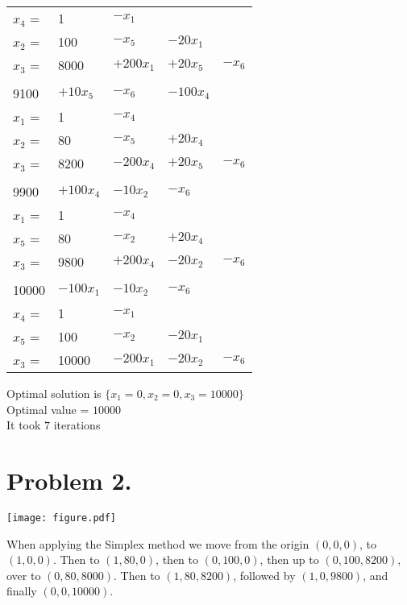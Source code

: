 \documentclass[12pt]{report}
\begin{document}
\begin{tabular}{ l l l l l }
  $x_4$ = & 1 &  $-x_1$ \\ 
  $x_2$ = & 100 & $- x_5$ & $-20x_1$ \\ 
  $x_3$ = & 8000  & $+200x_1$ & $+20x_5$ & $-x_6$  \\ 

  \\
  9100 & $+10x_5$ & $-x_6$ & $-100x_4$  \\  \hline

  $x_1$ = & 1 &  $-x_4$ \\ 
  $x_2$ = & 80 & $- x_5$ & $+20x_4$ \\ 
  $x_3$ = & 8200  & $-200x_4$ & $+20x_5$ & $-x_6$  \\ 

  \\
  9900 & $+100x_4$ & $-10x_2$ & $-x_6$  \\  \hline

  $x_1$ = & 1 &  $-x_4$ \\ 
  $x_5$ = & 80 & $- x_2$ & $+20x_4$ \\ 
  $x_3$ = & 9800  & $+200x_4$ & $-20x_2$ & $-x_6$  \\ 

  \\
  10000 & $-100x_1$ & $-10x_2$ & $-x_6$   \\  \hline

  $x_4$ = & 1 &  $-x_1$ \\ 
  $x_5$ = & 100 & $- x_2$ & $-20x_1$ \\ 
  $x_3$ = & 10000  & $-200x_1$ & $-20x_2$ & $-x_6$  \\ 

\end{tabular}


Optimal solution is $\{ x_1 = 0, x_2 = 0, x_3 = 10000 \}$\\
Optimal value = $10000$ \\
It took $7$ iterations


\section*{Problem 2.}

\texttt{[image: figure.pdf]}

When applying the Simplex method we move from the origin $(0,0,0)$, to $(1,0,0)$.
Then to $(1,80,0)$, then to $(0,100,0)$, then up to $(0,100,8200)$, over to $(0,80,8000)$.
Then to $(1,80,8200)$, followed by $(1,0,9800)$, and finally $(0,0,10000)$. \\
\end{document}

